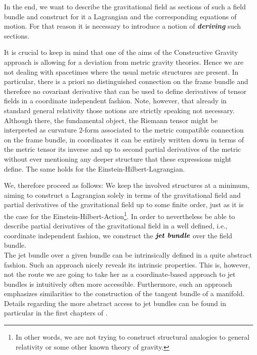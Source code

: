 \documentclass[a4paper,12pt, DIV=14, BCOR=5mm, twoside, headsepline, numbers=noenddot]{scrbook}
\begin{document}
In the end, we want to describe the gravitational field as sections of such a field bundle and construct for it a Lagrangian and the corresponding equations of motion. For that reason it is necessary to introduce a notion of \textit{\textbf{deriving}} such sections. 

It is crucial to keep in mind that one of the aims of the Constructive Gravity approach is allowing for a deviation from metric gravity theories. Hence we are not dealing with spacetimes where the usual metric structures are present. In particular, there is a priori no distinguished connection on the frame bundle and therefore no covariant derivative that can be used to define derivatives of tensor fields in a coordinate independent fashion. Note, however, that already in standard general relativity those notions are strictly speaking not necessary. Although there, the fundamental object, the Riemann tensor might be interpreted as curvature 2-form associated to the metric compatible connection on the frame bundle, in coordinates it can be entirely written down in terms of the metric tensor its inverse and up to second partial derivatives of the metric without ever mentioning any deeper structure that these expressions might define. The same holds for the Einstein-Hilbert-Lagrangian. 

We, therefore proceed as follows: We keep the involved structures at a minimum, aiming to construct a Lagrangian solely in terms of the gravitational field and partial derivatives of the gravitational field up to some finite order, just as it is the case for the Einstein-Hilbert-Action\footnote{In other words, we are not trying to construct structural analogies to general relativity or some other known theory of gravity.}. In order to nevertheless be able to describe partial derivatives of the gravitational field in a well defined, i.e., coordinate independent fashion, we construct the $\textit{\textbf{jet bundle}}$ over the field bundle.  \\

The jet bundle over a given bundle can be intrinsically defined in a quite abstract fashion. Such an approach nicely reveals its intrinsic properties. This is, however, not the route we are going to take her as a coordinate-based approach to jet bundles is intuitively often more accessible. Furthermore, such an approach emphasizes similarities to the construction of the tangent bundle of a manifold. Details regarding the more abstract access to jet bundles can be found in particular in the first chapters of \cite{seiler2009involution}. 
\end{document}

